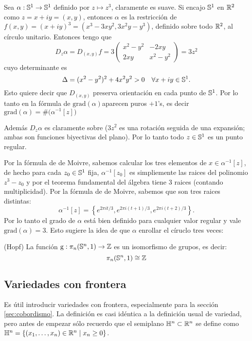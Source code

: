 \documentclass[../../topologia_algebraica]{subfiles}
\begin{document}
\begin{ejemplo}
  Sea $\alpha:\mathbb{S}^1\rightarrow\mathbb{S}^1$ definido por $z\mapsto z^3$, claramente es suave. Si encajo $\mathbb{S}^1$
  en $\mathbb{R}^2$ como $z=x+iy=(x,y)$, entonces $\alpha$ es la restricci\'on de
  $f(x,y)=(x+iy)^3=(x^3-3xy^2,3x^2y-y^3)$, definido sobre todo $\mathbb{R}^2$, al c\'irculo unitario.
  Entonces tengo que
  \[
    D_z\alpha=D_{(x,y)}f=3
    \begin{pmatrix}
      x^2-y^2 & -2xy \\
      2xy & x^2-y^2      
    \end{pmatrix}=
    3z^2
  \]
  cuyo determinante es
  \[
    \Delta=(x^2-y^2)^2+4x^2y^2>0  \quad\forall x+iy\in\mathbb{S}^1.
  \]
  Esto quiere decir que $D_{(x,y)}$ preserva orientaci\'on en cada punto de $\mathbb{S}^1$. Por lo tanto
  en la f\'ormula de $\text{grad}(\alpha)$aparecen puros $+1$'s, es decir
  $\text{grad}(\alpha)=\#\big( \alpha^{-1}[z] \big)$

  Adem\'as $D_z\alpha$
  es claramente sobre ($3z^2$ es una rotaci\'on seguida de una expansi\'on; ambas son funciones biyectivas
  del plano). Por lo tanto todo $z\in\mathbb{S}^1$ es un punto regular.

  Por la f\'ormula de de Moivre, sabemos calcular los tres elementos de $x\in\alpha^{-1}[z]$, de hecho
  para cada $z_0\in\mathbb{S}^1$ fija, $\alpha^{-1}[z_0]$ es simpliemente las raices del polinomio $z^3-z_0$
  y por el teorema fundamental del \'algebra tiene 3 raices (contando multiplicidad). Por la f\'ormula de
  de Moivre, sabemos que son tres raices distintas:
  \[
    \alpha^{-1}[z]=\left\{ e^{2\pi it/3},e^{2\pi i(t+1)/3},e^{2\pi i(t+2)/3} \right\}.
  \]
  Por lo tanto el grado de $\alpha$ est\'a bien definido para cualquier valor regular y vale
  $\text{grad}(\alpha)=3$. Esto sugiere la idea de que $\alpha$ enrollar el c\'iruclo tres veces:
\end{ejemplo}

\begin{thm}(Hopf)
  La funci\'on $\text{g}:\pi_n(\mathbb{S}^n,1)\rightarrow\mathbb{Z}$ es un isomorfismo de grupos, es decir:
  \[
    \pi_n(\mathbb{S}^n,1)\cong\mathbb{Z}
  \]
\end{thm}

\subsection{Variedades con frontera}

Es \'util introducir variedades con frontera, especialmente para la secci\'on \ref{sec:cobordismo}.
La definici\'on es casi id\'entica a la definici\'on usual de variedad, pero antes de empezar s\'olo
recuerdo que el semiplano $\mathbb{H}^n\subset\mathbb{R}^n$ se define como
$\mathbb{H}^n=\{(x_1,\ldots,x_{n})\in\mathbb{R}^n\mid x_n\geq 0\}$.
\end{document}
